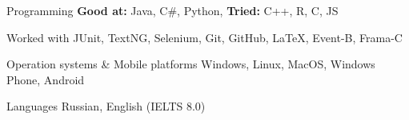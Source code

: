 


\begin{cvskills}


\cvskill
{Programming} %
{\textbf{Good at:} Java, C\#, Python, \textbf{Tried:} C++, R, C, JS} %

\cvskill
{Worked with} %
{JUnit, TextNG, Selenium, Git, GitHub, LaTeX, Event-B, Frama-C} %

\cvskill
{Operation systems \& Mobile platforms} %
{Windows, Linux, MacOS, Windows Phone, Android} %


\cvskill
{Languages} %
{Russian, English (IELTS 8.0)} %


\end{cvskills}